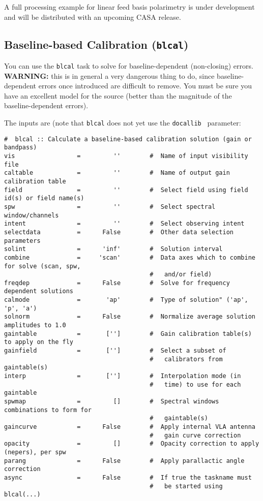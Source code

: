 A full processing example for linear feed basis polarimetry is under
development and will be distributed with an upcoming CASA release.

\subsection{Baseline-based Calibration ({\tt blcal})}
\label{section:cal.solve.blcal}

You can use the {\tt blcal} task to solve for baseline-dependent
(non-closing) errors.  {\bf WARNING:} this is in general a very dangerous
thing to do, since baseline-dependent errors once introduced are
difficult to remove.  You must be sure you have an excellent model
for the source (better than the magnitude of the baseline-dependent
errors).

The inputs are (note that {\tt blcal} does not yet use the 
{\tt docallib } parameter:
\small
\begin{verbatim}
#  blcal :: Calculate a baseline-based calibration solution (gain or bandpass)
vis                 =         ''        #  Name of input visibility file
caltable            =         ''        #  Name of output gain calibration table
field               =         ''        #  Select field using field id(s) or field name(s)
spw                 =         ''        #  Select spectral window/channels
intent              =         ''        #  Select observing intent
selectdata          =      False        #  Other data selection parameters
solint              =      'inf'        #  Solution interval
combine             =     'scan'        #  Data axes which to combine for solve (scan, spw,
                                        #   and/or field)
freqdep             =      False        #  Solve for frequency dependent solutions
calmode             =       'ap'        #  Type of solution" ('ap', 'p', 'a')
solnorm             =      False        #  Normalize average solution amplitudes to 1.0
gaintable           =       ['']        #  Gain calibration table(s) to apply on the fly
gainfield           =       ['']        #  Select a subset of
                                        #   calibrators from gaintable(s)
interp              =       ['']        #  Interpolation mode (in
                                        #   time) to use for each gaintable
spwmap              =         []        #  Spectral windows combinations to form for
                                        #   gaintable(s)
gaincurve           =      False        #  Apply internal VLA antenna
                                        #   gain curve correction
opacity             =         []        #  Opacity correction to apply (nepers), per spw
parang              =      False        #  Apply parallactic angle correction
async               =      False        #  If true the taskname must
                                        #   be started using blcal(...)

\end{verbatim}
\normalsize

